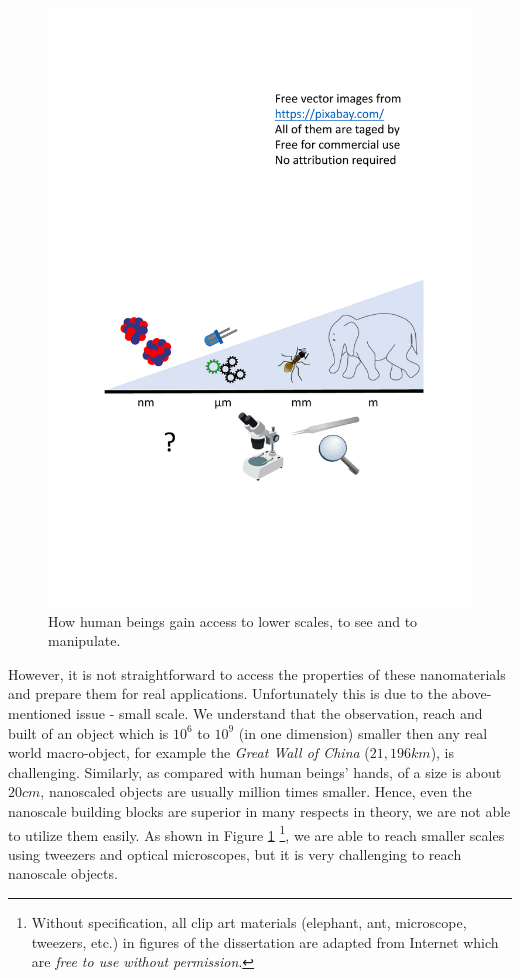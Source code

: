\begin{figure} 
\centering
\includegraphics[width=\textwidth]{figures/figure1_scale_problem.pdf}
\caption[Scale problem]{How human beings gain access to lower scales, to see and to manipulate.\footnotemark[1]
\label{fig:1_scale}}
\end{figure}

However, it is not straightforward to access the properties of these nanomaterials and prepare them for real applications. Unfortunately this is due to the above-mentioned issue - small scale. We understand that the observation, reach and built of an object which is $10^6$ to $10^9$ (in one dimension) smaller then any real world macro-object, for example the {\em Great Wall of China} ($21,196 km$), is challenging. Similarly, as compared with human beings' hands, of a size is about $20 cm$, nanoscaled objects are usually million times smaller. Hence, even the nanoscale building blocks are superior in many respects in theory, we are not able to utilize them easily. As shown in Figure \ref{fig:1_scale} \footnote{Without specification, all clip art materials (elephant, ant, microscope, tweezers, etc.) in figures of the dissertation are adapted from Internet which are {\em free to use without permission}.}, we are able to reach smaller scales using tweezers and optical microscopes, but it is very challenging to reach nanoscale objects. 

